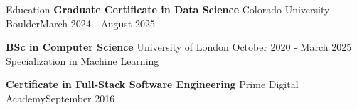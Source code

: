 \documentclass[
	11pt, %
]{resume} %
\begin{document}

\begin{rSection}{Education}
	\textbf{Graduate Certificate in Data Science} Colorado University Boulder\hfill{March 2024 - August 2025}

	\textbf{BSc in Computer Science} University of London \hfill{October 2020 - March 2025} \\ 
	Specialization in Machine Learning \smallskip
	
	\textbf{Certificate in Full-Stack Software Engineering} Prime Digital Academy\hfill{September 2016}
	
\end{rSection}

\end{document}
